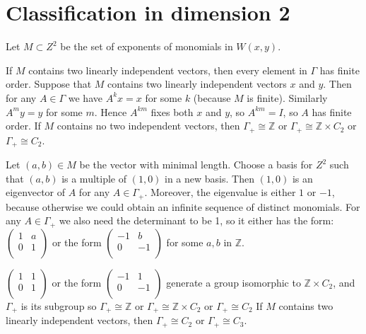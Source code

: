\documentclass[a4paper]{article}
\begin{document}
    \section{Classification in dimension 2}
    	Let $M \subset Z^2$ be the set of exponents of monomials in $W(x,y)$.
    
    \clm If $M$ contains two linearly independent vectors, then every element in $\Gamma$ has finite order.
    Suppose that $M$ contains two linearly independent vectors $x$ and $y$. Then for any $A \in \Gamma$ we have $A^k x= x$ for some $k$ (because $M$ is finite). Similarly $A^m y = y$ for some $m$. Hence $A^{k m}$ fixes both $x$ and $y$, so $A^{k m} = I$, so $A$ has finite order.
    \clm If $M$ contains no two independent vectors, then $\Gamma_+ \cong \mathbb{Z}$ or $\Gamma_+ \cong \mathbb{Z} \times C_{2}$ or $\Gamma_+ \cong C_{2}$.
    
    Let $(a,b) \in M$ be the vector with minimal length.
    Choose a basis for $Z^2$ such that $(a,b)$ is a multiple of $(1,0)$ in a new basis. Then $(1,0)$ is an eigenvector of $A$ for any $A \in \Gamma_+$. Moreover, the eigenvalue is either $1$ or $-1$, because otherwise we could obtain an infinite sequence of distinct monomials. For any $A \in \Gamma_+$ we also need the determinant to be 1, so it either has the form:
    $\begin{pmatrix}
    1 & a \\
    0 & 1 \\
    \end{pmatrix}$ or the form 
    $\begin{pmatrix}
    -1 & b \\
    0 & -1 \\
    \end{pmatrix}$
    for some $a, b$ in $\mathbb{Z}$.
    
    $\begin{pmatrix}
    1 & 1 \\ 
    0 & 1 \\
    \end{pmatrix}$ or the form 
    $\begin{pmatrix}
    -1 & 1 \\
    0 & -1 \\
    \end{pmatrix}$ generate a group isomorphic to $\mathbb{Z} \times C_2$, and $\Gamma_+$ is its subgroup so $\Gamma_+ \cong \mathbb{Z}$ or $\Gamma_+ \cong \mathbb{Z} \times C_2$ or $\Gamma_+ \cong C_2$
    \clm If $M$ contains two linearly independent vectors, then $\Gamma_+ \cong C_2$ or $\Gamma_+ \cong C_3$.
    
\end{document}

